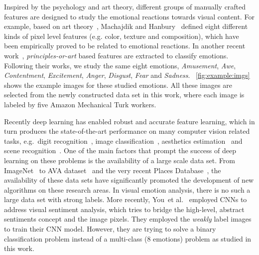 \documentclass[letterpaper]{article}
\begin{document}
Inspired by the psychology and art theory, different groups of manually crafted features are designed to study the emotional reactions towards visual content. For example, based on art theory~\cite{itten1973art,valdez1994effects}, Machajdik and Hanbury~\cite{machajdik2010affective} defined eight different kinds of pixel level features (e.g. color, texture and composition), which have been empirically proved to be related to emotional reactions.  In another recent work~\cite{Zhao:2014:EPF:2647868.2654930}, \textit{principles-or-art} based features are extracted to classify emotions. Following their works, we study the same eight emotions, \textit{Amusement}, \textit{Awe}, \textit{Contentment}, \textit{Excitement}, \textit{Anger}, \textit{Disgust}, \textit{Fear} and \textit{Sadness}. \figurename~\ref{fig:example:imgs} shows the example images for these studied emotions. All these images are selected from the newly constructed data set in this work, where each image is labeled by five Amazon Mechanical Turk workers.

Recently deep learning has enabled robust and accurate feature learning, which in turn produces the state-of-the-art performance on many computer vision related tasks, e.g.~digit recognition~\cite{lecun1989backpropagation,hinton2006fast}, image classification~\cite{cirecsan2011flexible,krizhevsky2012imagenet}, aesthetics estimation~\cite{lu2014rapid} and scene recognition~\cite{zhou2014learning}. One of the main factors that prompt the success of deep learning on these problems is the availability of a large scale data set. From ImageNet~\cite{deng2009imagenet} to AVA dataset~\cite{murray2012ava} and the very recent Places Database~\cite{zhou2014learning}, the availability of these data sets have significantly promoted the development of new algorithms on these research areas. %
In visual emotion analysis, there is no such a large data set with strong labels. More recently, You~et al.~\cite{you2015robust} employed CNNs to address visual sentiment analysis, which tries to bridge the high-level, abstract sentiments concept and the image pixels. They employed the \textit{weakly} label images to train their CNN model. However, they are trying to solve a binary classification problem instead of a multi-class (8 emotions) problem as studied in this work. %
\end{document}
